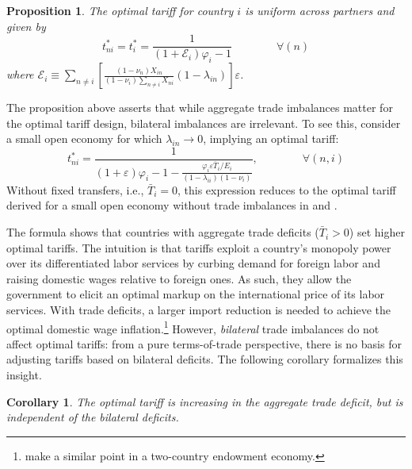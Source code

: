 \documentclass[12pt]{article}
\newtheorem{prop}{Proposition}
\newtheorem{crl}{Corollary}
\begin{document}
\begin{prop}
The optimal tariff for country $i$ is uniform across partners and given by
\[
t_{ni}^{*}=t^*_i=\frac{1}{\left(1+\mathscr{E}_{i}\right)\varphi_{i}-1} \qquad \qquad \forall (n)
\]
where $\mathscr{E}_{i}\equiv\sum_{n\neq i}\left[\frac{(1-\nu_{n})X_{in}}{\left(1-\nu_{i}\right)\sum_{n\neq i}X_{ni}}(1-\lambda_{in})\right]\varepsilon$.

\end{prop}
The proposition above asserts that while aggregate trade imbalances matter for the optimal tariff design, bilateral imbalances are irrelevant. To see this, consider a small open economy for which $\lambda_{in} \rightarrow 0$, implying an optimal tariff:
\[
t_{ni}^{*}=\frac{1}{(1+\varepsilon)\varphi_{i}-1-\frac{\varphi_{i}\varepsilon\bar{T}_{i}/E_{i}}{(1-\lambda_{ii})(1-\nu_{i})}},\qquad \qquad \forall (n,i)
\]
Without fixed transfers, i.e., $\bar{T}_i=0$, this expression reduces to the optimal tariff derived for a small open economy without trade imbalances in \cite{CALIENDO_FEENSTRA_JIE}  and \citet{demidova2024small}.

The formula shows that countries with aggregate trade deficits ($\bar{T}_i>0$) set higher optimal tariffs. The intuition is that tariffs exploit a country's monopoly power over its differentiated labor services by curbing demand for foreign labor and raising domestic wages relative to foreign ones. As such, they allow the government to elicit an optimal markup on the international price of its labor services. With trade deficits, a larger import reduction is needed to achieve the optimal domestic wage inflation.\footnote{\cite{pujolas2024trade} make a similar point in a two-country endowment economy.} However, \textit{bilateral} trade imbalances do not affect optimal tariffs: from a pure terms-of-trade perspective, there is no basis for adjusting tariffs based on bilateral deficits. The following corollary formalizes this insight.

\begin{crl}
The optimal tariff is increasing in the aggregate trade deficit, but is independent of the bilateral deficits. 
\end{crl}
\end{document}

